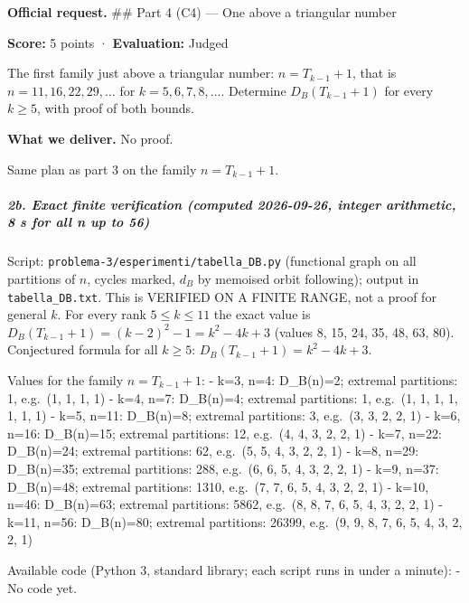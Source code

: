 
\textbf{Official request.} \#\# Part 4 (C4) --- One above a triangular
number

\textbf{Score:} 5 points · \textbf{Evaluation:} Judged

The first family just above a triangular number: \(n = T_{k-1} + 1\),
that is \(n = 11, 16, 22, 29, \ldots\) for \(k = 5, 6, 7, 8, \ldots\).
Determine \(D_B(T_{k-1} + 1)\) for every \(k \ge 5\), with proof of both
bounds.

\textbf{What we deliver.} No proof.


Same plan as part 3 on the family \(n=T_{k-1}+1\).

\subparagraph{2b. Exact finite verification (computed 2026-09-26,
integer arithmetic, 8 s for all n up to
56)}\label{b.-exact-finite-verification-computed-2026-09-26-integer-arithmetic-8-s-for-all-n-up-to-56}

Script: \texttt{problema-3/esperimenti/tabella\_DB.py} (functional graph
on all partitions of \(n\), cycles marked, \(d_B\) by memoised orbit
following); output in \texttt{tabella\_DB.txt}. This is VERIFIED ON A
FINITE RANGE, not a proof for general \(k\). For every rank
\(5\le k\le 11\) the exact value is
\(D_B(T_{k-1}+1)=(k-2)^2-1=k^2-4k+3\) (values 8, 15, 24, 35, 48, 63,
80). Conjectured formula for all \(k\ge5\): \(D_B(T_{k-1}+1)=k^2-4k+3\).

Values for the family \(n=T_{k-1}+1\): - k=3, n=4: D\_B(n)=2; extremal
partitions: 1, e.g.~(1, 1, 1, 1) - k=4, n=7: D\_B(n)=4; extremal
partitions: 1, e.g.~(1, 1, 1, 1, 1, 1, 1) - k=5, n=11: D\_B(n)=8;
extremal partitions: 3, e.g.~(3, 3, 2, 2, 1) - k=6, n=16: D\_B(n)=15;
extremal partitions: 12, e.g.~(4, 4, 3, 2, 2, 1) - k=7, n=22:
D\_B(n)=24; extremal partitions: 62, e.g.~(5, 5, 4, 3, 2, 2, 1) - k=8,
n=29: D\_B(n)=35; extremal partitions: 288, e.g.~(6, 6, 5, 4, 3, 2, 2,
1) - k=9, n=37: D\_B(n)=48; extremal partitions: 1310, e.g.~(7, 7, 6, 5,
4, 3, 2, 2, 1) - k=10, n=46: D\_B(n)=63; extremal partitions: 5862,
e.g.~(8, 8, 7, 6, 5, 4, 3, 2, 2, 1) - k=11, n=56: D\_B(n)=80; extremal
partitions: 26399, e.g.~(9, 9, 8, 7, 6, 5, 4, 3, 2, 2, 1)


Available code (Python 3, standard library; each script runs in under a
minute): - No code yet.


